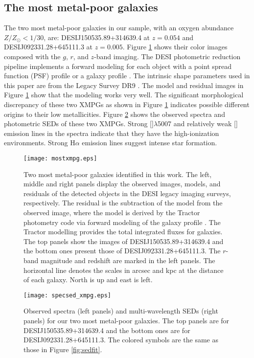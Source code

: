 \documentclass[twocolumn]{aastex631}
\newcommand{\Ha}{\mbox{H$\alpha$}}      %
\newcommand{\OIIIFIZ}{[\mbox{\ion{O}{3}}]$\lambda$5007}
\newcommand{\OII}{[\mbox{\ion{O}{2}}]}    %
\newcommand{\Zsun}{\mbox{$Z_{\odot}$}}
\newcommand{\boldtext}[1]{\textcolor[rgb]{0,0,0}{#1}}
\begin{document}
\subsection{The most metal-poor galaxies} \label{sec:mostoh}
The two most metal-poor galaxies in our sample, with an oxygen abundance $Z/\Zsun<1/30$, are: DESIJ150535.89+314639.4 at $z=0.054$ and DESIJ092331.28+645111.3 at $z=0.005$. Figure \ref{fig:mostxmpg} shows their color images composed with the $g$, $r$, and $z$-band imaging. The DESI photometric reduction pipeline implements a forward modeling for each object with a point spread function (PSF) profile or a galaxy profile \citep{Dey19}. The intrinsic shape parameters used in this paper are from the Legacy Survey DR9 \citep{Sch23}. The model and residual images in Figure \ref{fig:mostxmpg} show that the modeling works very well. The significant morphological discrepancy of these two XMPGs as shown in Figure \ref{fig:mostxmpg} indicates possible different origins to their low metallicities. Figure \ref{fig:specsed} shows the observed spectra and photometric SEDs of these two XMPGs. Strong {\OIIIFIZ} and relatively weak {\OII} emission lines in the spectra indicate that they have the high-ionization environments. Strong {\Ha} emission lines suggest intense star formation.
 \begin{figure}[tbh!]
\centering
\texttt{[image: mostxmpg.eps]}
\caption{Two most metal-poor galaxies identified in this work. The left, middle and right panels display the observed images, models, and residuals of the detected objects in the DESI legacy imaging surveys, respectively. The residual is the subtraction of the model from the observed image, where the model is derived by \boldtext{the Tractor photometry code via forward modeling of the galaxy profile \citep{Dey19}. The Tractor modelling provides the total integrated fluxes for galaxies.} The top panels show the images of DESIJ150535.89+314639.4 and the bottom ones present those of DESIJ092331.28+645111.3. The $r$-band magnitude and redshift are marked in the left panels. The horizontal line denotes the scales in arcsec and kpc at the distance of each galaxy. North is up and east is left.  \label{fig:mostxmpg}}
\end{figure}

\begin{figure}[tbh!]
\centering
\texttt{[image: specsed\_xmpg.eps]}
\caption{Observed spectra (left panels) and multi-wavelength SEDs (right panels) for our two most metal-poor galaxies. The top panels are for DESIJ150535.89+314639.4 and the bottom ones are for DESIJ092331.28+645111.3. The colored symbols are the same as those in Figure \ref{fig:sedfit}. \label{fig:specsed}}
\end{figure}
 
\end{document}
